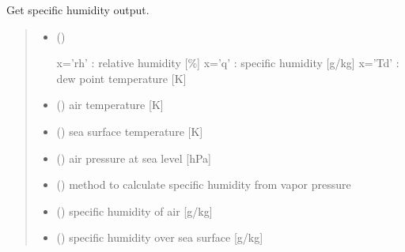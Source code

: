\documentclass[letterpaper,10pt,english]{sphinxmanual}
\begin{document}
\begin{fulllineitems}
\label{\detokenize{users_guide:hum_subs.get_hum}}
\pysigstartsignatures
{}
\pysigstopsignatures
\sphinxAtStartPar
Get specific humidity output.
\begin{quote}\begin{description}
\begin{itemize}
\item {} 
\sphinxAtStartPar
{} () \textendash{} \begin{description}
\sphinxAtStartPar
x=’rh’ : relative humidity {[}\%{]}
x=’q’ : specific humidity {[}g/kg{]}
x=’Td’ : dew point temperature {[}K{]}

\end{description}


\item {} 
\sphinxAtStartPar
{} () \textendash{} air temperature {[}K{]}

\item {} 
\sphinxAtStartPar
{} () \textendash{} sea surface temperature {[}K{]}

\item {} 
\sphinxAtStartPar
{} () \textendash{} air pressure at sea level {[}hPa{]}

\item {} 
\sphinxAtStartPar
{} () \textendash{} method to calculate specific humidity from vapor pressure

\end{itemize}

\sphinxAtStartPar
\begin{itemize}
\item {} 
\sphinxAtStartPar
{} () \textendash{} specific humidity of air {[}g/kg{]}

\item {} 
\sphinxAtStartPar
{} () \textendash{} specific humidity over sea surface {[}g/kg{]}

\end{itemize}


\end{description}\end{quote}

\end{fulllineitems}
\end{document}
